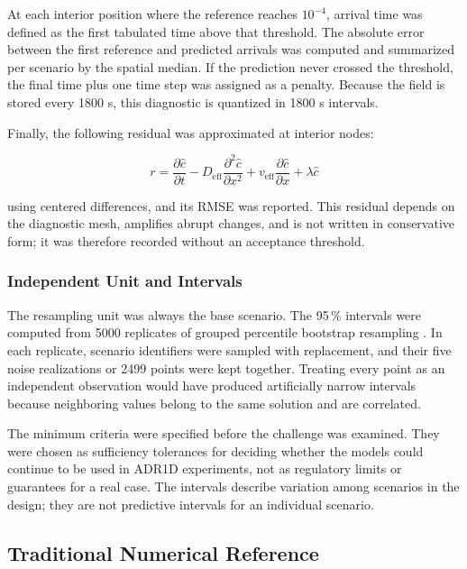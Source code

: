 \documentclass[11pt,a4paper]{article}
\begin{document}
At each interior position where the reference reaches $10^{-4}$, arrival time
was defined as the first tabulated time above that threshold. The absolute
error between the first reference and predicted arrivals was computed and
summarized per scenario by the spatial median. If the prediction never crossed
the threshold, the final time plus one time step was assigned as a penalty.
Because the field is stored every 1800 s, this diagnostic is quantized in
1800 s intervals.

Finally, the following residual was approximated at interior nodes:

\begin{equation}
r=\frac{\partial \widehat c}{\partial t}
-D_{\mathrm{eff}}\frac{\partial^2\widehat c}{\partial x^2}
+v_{\mathrm{eff}}\frac{\partial\widehat c}{\partial x}
+\lambda\widehat c
\label{eq:pde-residual}
\end{equation}

using centered differences, and its RMSE was reported. This residual depends
on the diagnostic mesh, amplifies abrupt changes, and is not written in
conservative form; it was therefore recorded without an acceptance threshold.

\subsubsection{Independent Unit and Intervals}

The resampling unit was always the base scenario. The 95\,\% intervals were
computed from 5000 replicates of grouped percentile bootstrap resampling
\cite{efron1993}. In each replicate, scenario identifiers were sampled with
replacement, and their five noise realizations or 2499 points were kept
together. Treating every point as an independent observation would have
produced artificially narrow intervals because neighboring values belong to
the same solution and are correlated.

The minimum criteria were specified before the challenge was examined. They
were chosen as sufficiency tolerances for deciding whether the models could
continue to be used in ADR1D experiments, not as regulatory limits or
guarantees for a real case. The intervals describe variation among scenarios
in the design; they are not predictive intervals for an individual scenario.

\subsection{Traditional Numerical Reference}
\label{sec:numerical-method}
\end{document}
